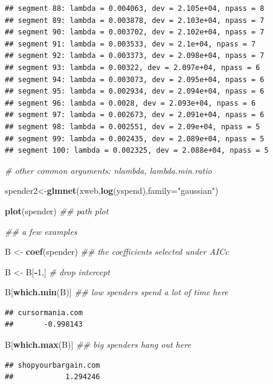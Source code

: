 \documentclass[
]{article}
\newenvironment{Shaded}{\begin{snugshade}}{\end{snugshade}}
\newcommand{\AttributeTok}[1]{\textcolor[rgb]{0.13,0.29,0.53}{#1}}
\newcommand{\CommentTok}[1]{\textcolor[rgb]{0.56,0.35,0.01}{\textit{#1}}}
\newcommand{\DecValTok}[1]{\textcolor[rgb]{0.00,0.00,0.81}{#1}}
\newcommand{\DocumentationTok}[1]{\textcolor[rgb]{0.56,0.35,0.01}{\textit{#1}}}
\newcommand{\FunctionTok}[1]{\textcolor[rgb]{0.13,0.29,0.53}{\textbf{#1}}}
\newcommand{\NormalTok}[1]{#1}
\newcommand{\OtherTok}[1]{\textcolor[rgb]{0.56,0.35,0.01}{#1}}
\newcommand{\SpecialCharTok}[1]{\textcolor[rgb]{0.81,0.36,0.00}{\textbf{#1}}}
\newcommand{\StringTok}[1]{\textcolor[rgb]{0.31,0.60,0.02}{#1}}
\begin{document}
\begin{verbatim}
## segment 88: lambda = 0.004063, dev = 2.105e+04, npass = 8
## segment 89: lambda = 0.003878, dev = 2.103e+04, npass = 7
## segment 90: lambda = 0.003702, dev = 2.102e+04, npass = 7
## segment 91: lambda = 0.003533, dev = 2.1e+04, npass = 7
## segment 92: lambda = 0.003373, dev = 2.098e+04, npass = 7
## segment 93: lambda = 0.00322, dev = 2.097e+04, npass = 6
## segment 94: lambda = 0.003073, dev = 2.095e+04, npass = 6
## segment 95: lambda = 0.002934, dev = 2.094e+04, npass = 6
## segment 96: lambda = 0.0028, dev = 2.093e+04, npass = 6
## segment 97: lambda = 0.002673, dev = 2.091e+04, npass = 6
## segment 98: lambda = 0.002551, dev = 2.09e+04, npass = 5
## segment 99: lambda = 0.002435, dev = 2.089e+04, npass = 5
## segment 100: lambda = 0.002325, dev = 2.088e+04, npass = 5
\end{verbatim}

\begin{Shaded}
\begin{Highlighting}[]
\CommentTok{\# other common arguments: nlambda, lambda.min.ratio}

\NormalTok{spender2}\OtherTok{\textless{}{-}}\FunctionTok{glmnet}\NormalTok{(xweb,}\FunctionTok{log}\NormalTok{(yspend),}\AttributeTok{family=}\StringTok{"gaussian"}\NormalTok{)}


\FunctionTok{plot}\NormalTok{(spender) }\DocumentationTok{\#\# path plot}
\end{Highlighting}
\end{Shaded}


\begin{Shaded}
\begin{Highlighting}[]
\DocumentationTok{\#\# a few examples}


\NormalTok{B }\OtherTok{\textless{}{-}} \FunctionTok{coef}\NormalTok{(spender) }\DocumentationTok{\#\# the coefficients selected under AICc}

\NormalTok{B }\OtherTok{\textless{}{-}}\NormalTok{ B[}\SpecialCharTok{{-}}\DecValTok{1}\NormalTok{,] }\CommentTok{\# drop intercept }

\NormalTok{B[}\FunctionTok{which.min}\NormalTok{(B)] }\DocumentationTok{\#\# low spenders spend a lot of time here}
\end{Highlighting}
\end{Shaded}

\begin{verbatim}
## cursormania.com 
##       -0.998143
\end{verbatim}

\begin{Shaded}
\begin{Highlighting}[]
\NormalTok{B[}\FunctionTok{which.max}\NormalTok{(B)] }\DocumentationTok{\#\# big spenders hang out here}
\end{Highlighting}
\end{Shaded}

\begin{verbatim}
## shopyourbargain.com 
##            1.294246
\end{verbatim}
\end{document}
